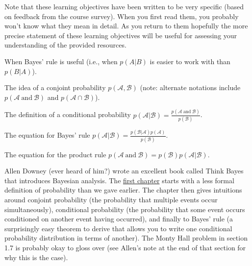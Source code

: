 \documentclass[assignment01_Solutions]{subfiles}
\begin{document}
\begin{externalresources}[(60 minutes)]
\begin{learningobjectives}
Note that these learning objectives have been written to be very specific (based on feedback from the course survey).  When you first read them, you probably won't know what they mean in detail.  As you return to them hopefully the more precise statement of these learning objectives will be useful for assessing your understanding of the provided resources.

\bi
\item When Bayes' rule is useful (i.e., when $p(A|B)$ is easier to work with than $p(B|A)$).
\item The idea of a conjoint probability $p(\mathcal{A}, \mathcal{B})$ (note: alternate notations include $p(\mathcal{A}~\mbox{and}~\mathcal{B})$ and $p(\mathcal{A} \cap \mathcal{B})$).
\item The definition of a conditional probability $p(\mathcal{A} | \mathcal{B}) = \frac{p(\mathcal{A}~\mbox{and}~\mathcal{B})}{p(\mathcal{B})}$.
\item The equation for Bayes' rule $p(\mathcal{A} | \mathcal{B}) = \frac{p(\mathcal{B} | \mathcal{A}) p(\mathcal{A})}{p(\mathcal{B})}$.
\item The equation for the product rule $p(\mathcal{A}~\mbox{and}~\mathcal{B}) = p(\mathcal{B}) p(\mathcal{A} | \mathcal{B})$.
\ei
\end{learningobjectives}

Allen Downey (ever heard of him?) wrote an excellent book called Think Bayes that introduces Bayesian analysis.  The \href{http://www.greenteapress.com/thinkbayes/html/thinkbayes002.html}{first chapter} starts with a less formal definition of probability than we gave earlier.  The chapter then gives intuitions around conjoint probability (the probability that multiple events occur simultaneously), conditional probability (the probability that some event occurs conditioned on another event having occurred), and finally to Bayes' rule (a surprisingly easy theorem to derive that allows you to write one conditional probability distribution in terms of another).  The Monty Hall problem in section 1.7 is probably okay to gloss over (see Allen's note at the end of that section for why this is the case).


\end{externalresources}
\end{document}
